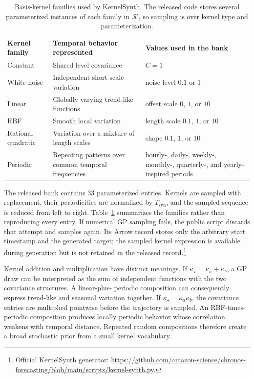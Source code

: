 \begin{table}[H]
\centering
\small
\renewcommand{\arraystretch}{1.08}
\begin{tabular}{@{}p{}p{}p{}@{}}
\toprule
Kernel family & Temporal behavior represented & Values used in the bank \\
\midrule
Constant & Shared level covariance & $C=1$ \\
White noise & Independent short-scale variation & noise level $0.1$ or $1$ \\
Linear & Globally varying trend-like functions & offset scale $0$, $1$, or $10$ \\
RBF & Smooth local variation & length scale $0.1$, $1$, or $10$ \\
Rational quadratic & Variation over a mixture of length scales &
shape $0.1$, $1$, or $10$ \\
Periodic & Repeating patterns over common temporal frequencies &
hourly-, daily-, weekly-, monthly-, quarterly-, and yearly-inspired periods \\
\bottomrule
\end{tabular}
\caption{Basis-kernel families used by KernelSynth. The released code stores
several parameterized instances of each family in $\mathcal K$, so sampling is
over kernel type and parameterization.}
\label{tab:kernelsynth-bank}
\end{table}

The released bank contains 33 parameterized entries. Kernels are sampled with
replacement, their periodicities are normalized by $T_{\mathrm{syn}}$, and the
sampled sequence is reduced from left to right. Table~\ref{tab:kernelsynth-bank}
summarizes the families rather than reproducing every entry. If numerical GP
sampling fails, the public script discards that attempt and samples again.
Its Arrow record stores only the arbitrary start timestamp and the generated
target; the sampled kernel expression is available during generation but is
not retained in the released record.\footnote{Official KernelSynth generator:
\url{https://github.com/amazon-science/chronos-forecasting/blob/main/scripts/kernel-synth.py}.}

Kernel addition and multiplication have distinct meanings. If
$\kappa_\star=\kappa_a+\kappa_b$, a GP draw can be interpreted as the sum of
independent functions with the two covariance structures. A linear-plus-
periodic composition can consequently express trend-like and seasonal
variation together. If
$\kappa_\star=\kappa_a\kappa_b$, the covariance entries are multiplied
pointwise before the trajectory is sampled. An RBF-times-periodic
composition produces locally periodic behavior whose
correlation weakens with temporal distance. Repeated random compositions
therefore create a broad stochastic prior from a small kernel vocabulary.

